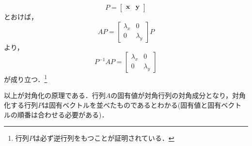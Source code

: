 \documentclass[a4paper,12pt,autodetect-engine,dvipdfmx]{jsarticle}
\theoremstyle{definition}
\begin{document}
\begin{equation*}
    P=
    \begin{bmatrix}
        \bm{x} & \bm{y}
    \end{bmatrix}
\end{equation*}
とおけば，
\begin{equation*}
    AP = 
    \begin{bmatrix}
        \lambda_{x} & 0\\
        0 & \lambda_{y}
    \end{bmatrix}P
\end{equation*}
より，
\begin{equation*}
    P^{-1}AP = 
    \begin{bmatrix}
        \lambda_{x} & 0\\
        0 & \lambda_{y}
    \end{bmatrix}
\end{equation*}
が成り立つ．\footnote{行列$P$は必ず逆行列をもつことが証明されている．}

以上が対角化の原理である．行列$A$の固有値が対角行列の対角成分となり，対角化する行列$P$は固有ベクトルを並べたものであるとわかる(固有値と固有ベクトルの順番は合わせる必要がある)．
\end{document}
